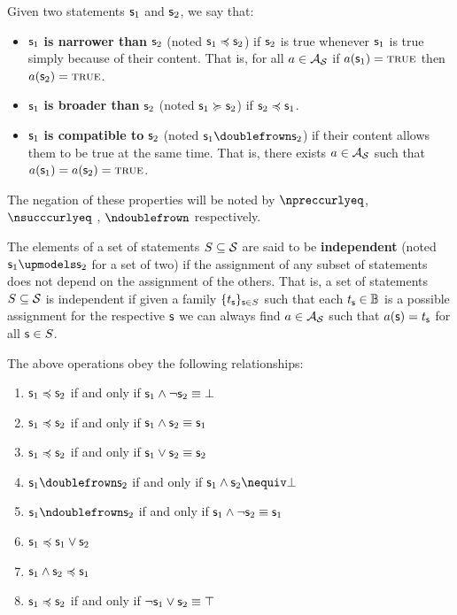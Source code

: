 \documentclass[11pt,letterpaper,fleqn]{memoir} %
\begin{document}
\begin{mathSection}

\begin{defn}\label{def_statement_narrowness_and_compatibility}
	Given two statements $\mathsf{s}_1$ and $\mathsf{s}_2$, we say that:
	\begin{itemize}
		\item $\mathsf{s}_1$ \textbf{is narrower than} $\mathsf{s}_2$ (noted $\mathsf{s}_1 \preccurlyeq \mathsf{s}_2$) if $\mathsf{s}_2$ is true whenever $\mathsf{s}_1$ is true simply because of their content. That is, for all $a \in \mathcal{A}_{\mathcal{S}}$ if $a(\mathsf{s}_1)=\textsc{true}$ then $a(\mathsf{s}_2)=\textsc{true}$.
		\item $\mathsf{s}_1$ \textbf{is broader than} $\mathsf{s}_2$ (noted $\mathsf{s}_1 \succcurlyeq \mathsf{s}_2$) if $\mathsf{s}_2 \preccurlyeq \mathsf{s}_1$.
		\item $\mathsf{s}_1$ \textbf{is compatible to} $\mathsf{s}_2$ (noted $\stmt_1 \comp \stmt_2$) if their content allows them to be true at the same time. That is, there exists $a \in \mathcal{A}_{\mathcal{S}}$ such that $a(\mathsf{s}_1)=a(\mathsf{s}_2)=\textsc{true}$.
	\end{itemize}
	The negation of these properties will be noted by $\nnarrower$, $\nbroader$ , $\ncomp$ respectively.
\end{defn}
\begin{defn}\label{def_independent_statements}
	The elements of a set of statements $S \subseteq \mathcal{S}$ are said to be \textbf{independent} (noted $\stmt_1 \indep \stmt_2$ for a set of two) if the assignment of any subset of statements does not depend on the assignment of the others. That is, a set of statements $S \subseteq \mathcal{S}$ is independent if given a family  $\{t_{\mathsf{s}}\}_{\mathsf{s} \in S}$ such that each $t_{\mathsf{s}} \in \mathbb{B}$ is a possible assignment for the respective $\mathsf{s}$ we can always find $a \in \mathcal{A}_{\mathcal{S}}$ such that $a(\mathsf{s}) = t_{\mathsf{s}}$ for all $\mathsf{s} \in S$.
\end{defn}

\begin{prop}\label{prop_narrowness_properties}
	The above operations obey the following relationships:
	\begin{enumerate}[label=(\roman*)]
		\item 	$\mathsf{s}_1 \preccurlyeq \mathsf{s}_2$ if and only if $\mathsf{s}_1 \wedge \neg \mathsf{s}_2 \equiv \bot$
		\item 	$\mathsf{s}_1 \preccurlyeq \mathsf{s}_2$ if and only if $\mathsf{s}_1 \wedge \mathsf{s}_2 \equiv \mathsf{s}_1$
		\item 	$\mathsf{s}_1 \preccurlyeq \mathsf{s}_2$ if and only if $\mathsf{s}_1 \vee \mathsf{s}_2 \equiv \mathsf{s}_2$
		\item 	$\stmt_1 \comp \stmt_2$ if and only if $\stmt_1 \AND \stmt_2 \nequiv \impossibility$
		\item 	$\stmt_1 \ncomp \stmt_2$ if and only if $\mathsf{s}_1 \wedge \neg \mathsf{s}_2 \equiv \mathsf{s}_1$
		\item 	$\mathsf{s}_1 \preccurlyeq \mathsf{s}_1 \vee \mathsf{s}_2$
		\item 	$\mathsf{s}_1 \wedge \mathsf{s}_2 \preccurlyeq \mathsf{s}_1$
		\item 	$\mathsf{s}_1 \preccurlyeq \mathsf{s}_2$ if and only if $\neg \mathsf{s}_1 \vee \mathsf{s}_2 \equiv \top$
	\end{enumerate}	
\end{prop}


\end{mathSection}
\end{document}
